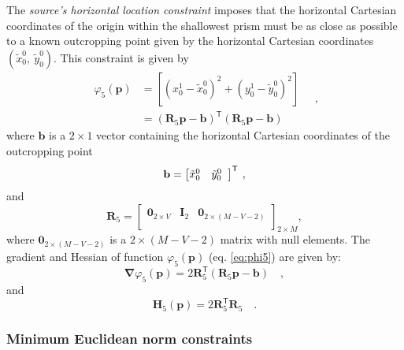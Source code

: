 The \textit{source's horizontal location constraint} imposes that the horizontal Cartesian coordinates of the origin within 
the shallowest prism must be as close as possible to a known outcropping point given by the horizontal Cartesian coordinates $(\tilde{x}_{0}^{0}, \: \tilde{y}_{0}^{0})$. 
This constraint is given by
\begin{equation}\label{eq:phi5}
\begin{split}
\varphi_{5}(\mathbf{p}) &= \left[\left(x_{0}^{1} - \tilde{x}_{0}^{0}\right)^2 
+ \left(y_{0}^{1} - \tilde{y}_{0}^{0}\right)^2\right] \\
&= \left(\mathbf{R}_{5} \mathbf{p} - \mathbf{b} \right)^{\mathsf{T}}
\left(\mathbf{R}_{5} \mathbf{p} - \mathbf{b}\right)
\end{split} \quad ,
\end{equation}
where $\mathbf{b}$ is a $2 \times 1$ vector containing the horizontal Cartesian coordinates of the outcropping point 
\begin{equation}
\mathbf{b} = \left[ \begin{array}{@{}*{12}{c}@{}}
\tilde{x}_{0}^{0} & \tilde{y}_{0}^{0} \\
\end{array} \right]^{\mathsf{T}} \: ,
\label{eq:b-vector}
\end{equation}
and
\begin{equation}
\mathbf{R}_{5} = 
\begin{bmatrix}
\mathbf{0}_{2 \times V} & \mathbf{I}_{2} & \mathbf{0}_{2 \times (M-V-2)} \\
\end{bmatrix}_{2 \times M},
\label{eq:R5-matrix}
\end{equation}
where $\mathbf{0}_{2 \times (M-V-2)}$ is a $2 \times (M-V-2)$ matrix 
with null elements. 
The gradient and Hessian of function $\varphi_{5}(\mathbf{p})$ (eq. \ref{eq:phi5}) are given by:
\begin{equation}\label{eq:phi5_grad}
\boldsymbol{\nabla}\varphi_{5}(\mathbf{p}) = 2\mathbf{R}_{5}^{\mathsf{T}}
\left(\mathbf{R}_{5} \mathbf{p} - \mathbf{b}\right) \quad ,
\end{equation}
and
\begin{equation}\label{eq:phi5_hessian}
\mathbf{H}_{5}(\mathbf{p}) = 2 \mathbf{R}^{\mathsf{T}}_{5}\mathbf{R}_{5} \quad .
\end{equation}

\subsubsection{Minimum Euclidean norm constraints}

